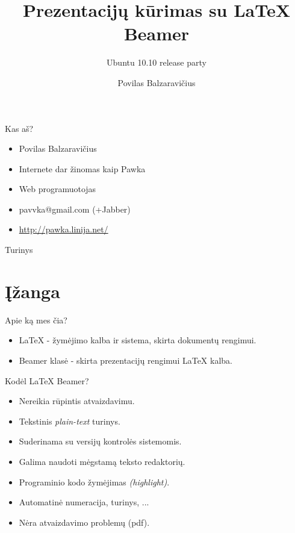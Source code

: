 \documentclass[11pt,a4paper]{beamer}
\author{Povilas Balzaravičius}
\title{Prezentacijų kūrimas su LaTeX Beamer}
\subtitle{Ubuntu 10.10 release party}
\begin{document}
\begin{frame}
	\titlepage
\end{frame}


\begin{frame}{Kas aš?}
    \begin{itemize}
        \item Povilas Balzaravičius
        \item Internete dar žinomas kaip Pawka
        \item Web programuotojas
        \item pavvka@gmail.com (+Jabber)
        \item \href{http://pawka.linija.net/}{http://pawka.linija.net/}
    \end{itemize}  
\end{frame}


\begin{frame}{Turinys}
	\tableofcontents
\end{frame}


\section{Įžanga}
\begin{frame}{Apie ką mes čia?}
    \begin{itemize}
        \item LaTeX - žymėjimo kalba ir sistema, skirta dokumentų rengimui.
        \item Beamer klasė - skirta prezentacijų rengimui LaTeX kalba.
    \end{itemize}
\end{frame}


\begin{frame}{Kodėl LaTeX Beamer?}
    \begin{itemize}
        \item Nereikia rūpintis atvaizdavimu.
        \item Tekstinis \textit{plain-text} turinys.
        \item Suderinama su versijų kontrolės sistemomis.
        \item Galima naudoti mėgstamą teksto redaktorių.
        \item Programinio kodo žymėjimas \textit{(highlight)}.
        \item Automatinė numeracija, turinys, ...
        \item Nėra atvaizdavimo problemų (pdf).
    \end{itemize}
\end{frame}
\end{document}
